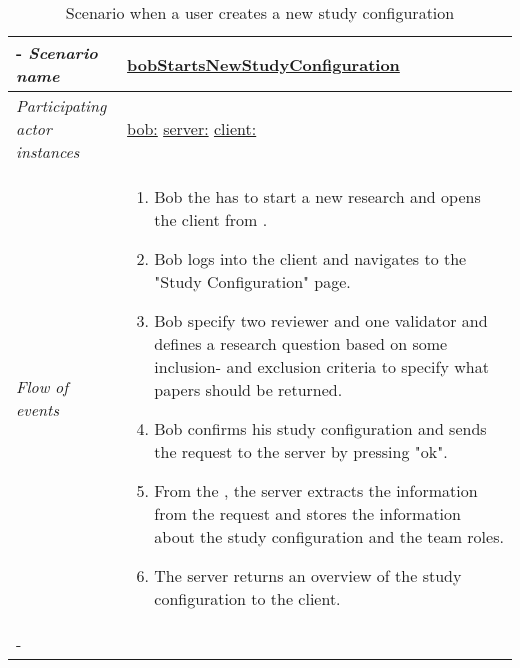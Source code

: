 \documentclass{article}
\begin{document}
%
%
\begin{table}[h!]
\tabulinesep=1.5mm
\begin{tabu} to 
	\tabucline[1.5pt]-
	\textit{Scenario name} & \underline{bobStartsNewStudyConfiguration} \\
	\hline
	\textit{Participating actor \newline instances} & \underline{bob:\researcher} \newline \underline{server:\serverside}
	\newline \underline{client:\clientside} \\
	\hline
	\textit{Flow of events} &
	\vspace{-3mm}
	\begin{enumerate}[leftmargin=*,topsep=0pt,itemsep=-1ex]
		\item Bob the \researcher has to start a new research  and opens the client from \clientside. 
		\item Bob logs into the client and navigates to the "Study Configuration" page. 
		
		\item Bob specify two reviewer and one validator and defines a research question based on some inclusion- and exclusion criteria to specify what papers should be returned. 
		
		\item Bob confirms his study configuration and sends the request to the server by pressing "ok".
		
		\item From the \serverside, the server extracts the information from the request and stores the information about the study configuration and the team roles.
		
		\item The server returns an overview of the study configuration to the client.
	\end{enumerate} \\
	\tabucline[1.5pt]-
\end{tabu}
\caption{Scenario when a user creates a new study configuration}
\label{sc:bobStartsNewStudyConfiguration}
\end{table}
\end{document}
